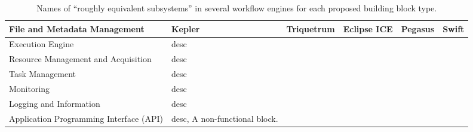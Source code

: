 \begin{table*}[h]
\begin{tabularx}{\textwidth}{|X|X|X|X|X|X|}
\hline
\textbf{File and Metadata Management} & \textbf{Kepler} & \textbf{Triquetrum} & \textbf{Eclipse ICE} & \textbf{Pegasus} & \textbf{Swift}
 \tabularnewline\hline 
Execution Engine & desc &&&& \tabularnewline\hline
Resource Management and Acquisition & desc &&&& \tabularnewline\hline 
Task Management & desc &&&& \tabularnewline\hline
Monitoring & desc &&&& \tabularnewline\hline 
Logging and Information & desc &&&& \tabularnewline\hline
Application Programming Interface (API) & desc, A non-functional block. &&&& \tabularnewline\hline
\end{tabularx}
\caption{Names of ``roughly equivalent subsystems'' in several workflow engines for each proposed building block type.}
\label{blocks}
\end{table*}